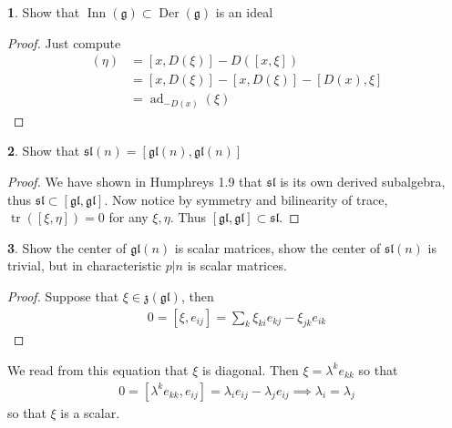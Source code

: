 \documentclass[10.5pt]{article}
\theoremstyle{definition}
\newtheorem{pb}{}
\numberwithin{example}{subsection}
\numberwithin{proposition}{subsection}
\numberwithin{pb}{subsection}
\begin{document}
        \begin{pb}
            Show that \(\operatorname{Inn}(\mathfrak{g}) \subset \operatorname{Der}(\mathfrak{g})\) is an ideal

            \begin{proof}
                Just compute
                \begin{align}
                    [\operatorname{ad}_\xi,D](\eta) &= [x,D(\xi)] - D([x,\xi])\\
                    &= [x,D(\xi)] - [x,D(\xi)] - [D(x),\xi] \\
                    &= \operatorname{ad}_{-D(x)}(\xi)
                \end{align}
            \end{proof}
        \end{pb}
        \begin{pb}
            Show that \(\mathfrak{sl}(n) = [\mathfrak{gl}(n),\mathfrak{gl}(n)]\)

            \begin{proof}
                We have shown in Humphreys 1.9 that \(\mathfrak{sl}\) is its own derived subalgebra, thus \(\mathfrak{sl} \subset [\mathfrak{gl},\mathfrak{gl}]\). Now notice by symmetry and bilinearity of trace, \(\operatorname{tr}([\xi,\eta]) = 0\) for any \(\xi,\eta\). Thus \([\mathfrak{gl},\mathfrak{gl}] \subset \mathfrak{sl}\).
            \end{proof}
        \end{pb}
        \begin{pb}
            Show the center of \(\mathfrak{gl}(n)\) is scalar matrices, show the center of \(\mathfrak{sl}(n)\) is trivial, but in characteristic \(p\vert n\) is scalar matrices.

            \begin{proof}
                Suppose that \(\xi \in \mathfrak{z}(\mathfrak{\mathfrak{gl}})\), then
                \begin{align}
                    0 = [\xi,e_{ij}] = \sum_k \xi_{ki} e_{kj} - \xi_{jk}e_{ik}
                \end{align}
            \end{proof}
            We read from this equation that \(\xi\) is diagonal. Then \(\xi = \lambda^k e_{kk}\) so that
            \begin{align}
                0 = [\lambda^k e_{kk},e_{ij}] = \lambda_i e_{ij} - \lambda_j e_{ij} \implies \lambda_i = \lambda_j \label{diagonalmult}
            \end{align}
            so that \(\xi\) is a scalar.
        \end{pb}
\end{document}
